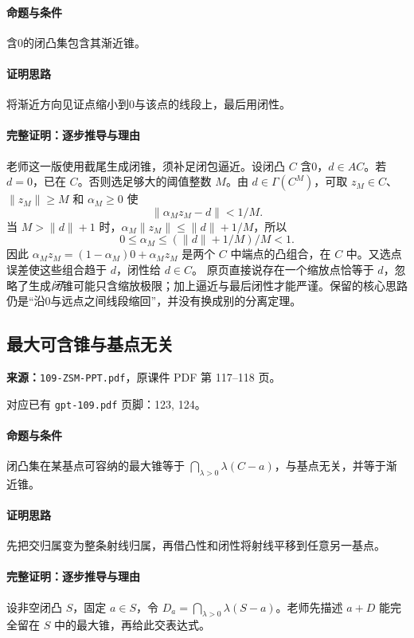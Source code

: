 \paragraph{命题与条件}含0的闭凸集包含其渐近锥。
\paragraph{证明思路}将渐近方向见证点缩小到0与该点的线段上，最后用闭性。
\paragraph{完整证明：逐步推导与理由}

老师这一版使用截尾生成闭锥，须补足闭包逼近。设闭凸 $C$ 含0，$d\in AC$。若 $d=0$，已在 $C$。否则选足够大的阈值整数 $M$。由 $d\in\Gamma(C^M)$，可取 $z_M\in C$、$\|z_M\|\ge M$ 和 $\alpha_M\ge0$ 使
\[\|\alpha_Mz_M-d\|<1/M.\]
当 $M>\|d\|+1$ 时，$\alpha_M\|z_M\|\le\|d\|+1/M$，所以
\[0\le\alpha_M\le(\|d\|+1/M)/M<1.\]
因此 $\alpha_Mz_M=(1-\alpha_M)0+\alpha_Mz_M$ 是两个 $C$ 中端点的凸组合，在 $C$ 中。又选点误差使这些组合趋于 $d$，闭性给 $d\in C$。
原页直接说存在一个缩放点恰等于 $d$，忽略了生成\emph{闭}锥可能只含缩放极限；加上逼近与最后闭性才能严谨。保留的核心思路仍是“沿0与远点之间线段缩回”，并没有换成别的分离定理。

\clearpage\subsection{最大可含锥与基点无关}
\textbf{来源：}\texttt{109-ZSM-PPT.pdf}，原课件 PDF 第 117--118 页。\par
对应已有 \texttt{gpt-109.pdf} 页脚：123, 124。\par
\paragraph{命题与条件}闭凸集在某基点可容纳的最大锥等于 $\bigcap_{\lambda>0}\lambda(C-a)$，与基点无关，并等于渐近锥。
\paragraph{证明思路}先把交归属变为整条射线归属，再借凸性和闭性将射线平移到任意另一基点。
\paragraph{完整证明：逐步推导与理由}

设非空闭凸 $S$，固定 $a\in S$，令 $D_a=\bigcap_{\lambda>0}\lambda(S-a)$。老师先描述 $a+D$ 能完全留在 $S$ 中的最大锥，再给此交表达式。
